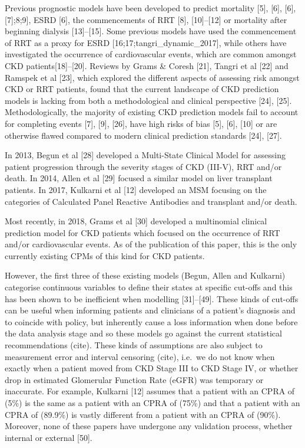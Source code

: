 \documentclass[12pt,twoside]{reedthesis}
\begin{document}
Previous prognostic models have been developed to predict mortality {[}5{]}, {[}6{]}, {[}6{]}, {[}7{]};8;9{]}, ESRD {[}6{]}, the commencements of RRT {[}8{]}, {[}10{]}--{[}12{]} or mortality after beginning dialysis {[}13{]}--{[}15{]}. Some previous models have used the commencement of RRT as a proxy for ESRD {[}16;17;tangri\_dynamic\_2017{]}, while others have investigated the occurrence of cardiovascular events, which are common amongst CKD patients{[}18{]}--{[}20{]}. Reviews by Grams \& Coresh {[}21{]}, Tangri et al {[}22{]} and Ramspek et al {[}23{]}, which explored the different aspects of assessing risk amongst CKD or RRT patients, found that the current landscape of CKD prediction models is lacking from both a methodological and clinical perspective {[}24{]}, {[}25{]}. Methodologically, the majority of existing CKD prediction models fail to account for completing events {[}7{]}, {[}9{]}, {[}26{]}, have high risks of bias {[}5{]}, {[}6{]}, {[}10{]} or are otherwise flawed compared to modern clinical prediction standards {[}24{]}, {[}27{]}.

In 2013, Begun et al {[}28{]} developed a Multi-State Clinical Model for assessing patient progression through the severity stages of CKD (III-V), RRT and/or death. In 2014, Allen et al {[}29{]} focused a similar model on liver transplant patients. In 2017, Kulkarni et al {[}12{]} developed an MSM focusing on the categories of Calculated Panel Reactive Antibodies and transplant and/or death.

Most recently, in 2018, Grams et al {[}30{]} developed a multinomial clinical prediction model for CKD patients which focused on the occurrence of RRT and/or cardiovascular events. As of the publication of this paper, this is the only currently existing CPMs of this kind for CKD patients.

However, the first three of these existing models (Begun, Allen and Kulkarni) categorise continuous variables to define their states at specific cut-offs and this has been shown to be inefficient when modelling {[}31{]}--{[}49{]}. These kinds of cut-offs can be useful when informing patients and clinicians of a patient's diagnosis and to coincide with policy, but inherently cause a loss information when done before the data analysis stage and so these models go against the current statistical recommendations (cite). These kinds of assumptions are also subject to measurement error and interval censoring (cite), i.e.~we do not know when exactly when a patient moved from CKD Stage III to CKD Stage IV, or whether drop in estimated Glomerular Function Rate (eGFR) was temporary or inaccurate. For example, Kulkarni {[}12{]} assumes that a patient with an CPRA of (5\%) is the same as a patient with an CPRA of (75\%) and that a patient with an CPRA of (89.9\%) is vastly different from a patient with an CPRA of (90\%). Moreover, none of these papers have undergone any validation process, whether internal or external {[}50{]}.
\end{document}
